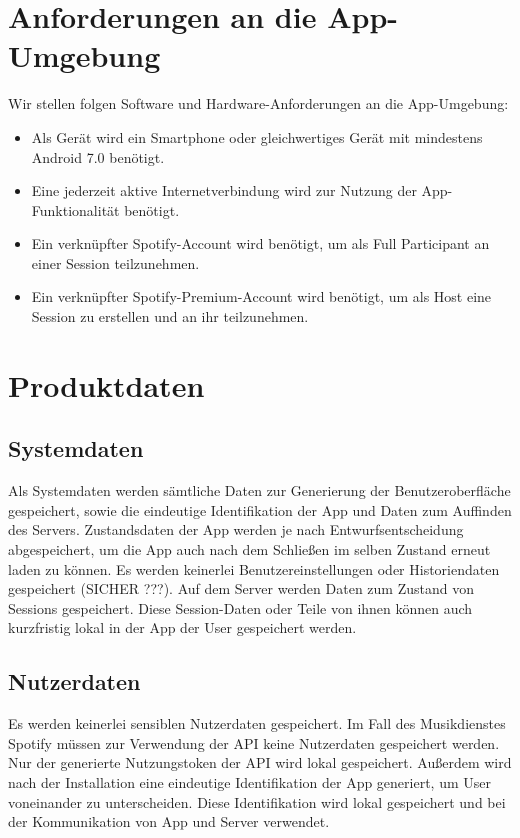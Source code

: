\documentclass[oneside, ngerman]{sdqtechreport}
\begin{document}
\chapter{Anforderungen an die App-Umgebung}
\label{chap:Appumgebung}

Wir stellen folgen Software und Hardware-Anforderungen an die App-Umgebung:

\begin{itemize}
    \item Als Gerät wird ein Smartphone oder gleichwertiges Gerät mit mindestens Android 7.0 benötigt.
    \item Eine jederzeit aktive Internetverbindung wird zur Nutzung der App-Funktionalität benötigt.
    \item Ein verknüpfter Spotify-Account wird benötigt, um als Full Participant an einer Session teilzunehmen.
    \item Ein verknüpfter Spotify-Premium-Account wird benötigt, um als Host eine Session zu erstellen und an ihr teilzunehmen.
\end{itemize}



\chapter{Produktdaten}
\label{chap:Produktdaten}

\section{Systemdaten}
\label{sec:Produktdaten:Systemdaten}

Als Systemdaten werden sämtliche Daten zur Generierung der Benutzeroberfläche gespeichert, sowie die eindeutige Identifikation der App und Daten zum Auffinden des Servers. Zustandsdaten der App werden je nach Entwurfsentscheidung abgespeichert, um die App auch nach dem Schließen im selben Zustand erneut laden zu können. Es werden keinerlei Benutzereinstellungen oder Historiendaten gespeichert (SICHER ???). Auf dem Server werden Daten zum Zustand von Sessions gespeichert. Diese Session-Daten oder Teile von ihnen können auch kurzfristig lokal in der App der User gespeichert werden.

\section{Nutzerdaten}
\label{sec:Produktdaten:Nutzerdaten}

Es werden keinerlei sensiblen Nutzerdaten gespeichert. Im Fall des Musikdienstes Spotify müssen zur Verwendung der API keine Nutzerdaten gespeichert werden. Nur der generierte Nutzungstoken der API wird lokal gespeichert. Außerdem wird nach der Installation eine eindeutige Identifikation der App generiert, um User voneinander zu unterscheiden. Diese Identifikation wird lokal gespeichert und bei der Kommunikation von App und Server verwendet.
\end{document}
